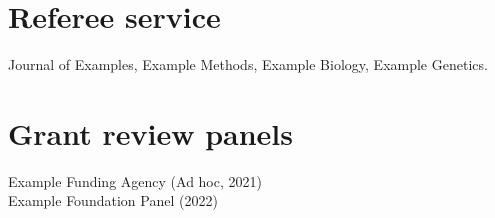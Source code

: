 
\section{\sc Referee service} Journal of Examples, Example Methods, Example Biology, Example Genetics.

\section{\sc Grant review panels}

Example Funding Agency (Ad hoc, 2021)\\
Example Foundation Panel (2022)\\

